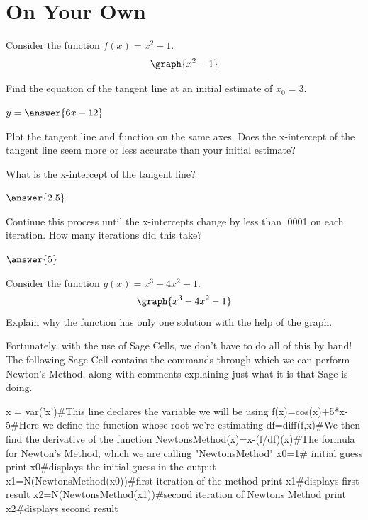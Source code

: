 \documentclass{ximera}
\begin{document}
\section{On Your Own}
\begin{question}
Consider the function $f(x) = x^2-1$.
\[
\graph{x^2-1}
\]

Find the equation of the tangent line at an initial estimate of $x_0=3$.

$y = \answer{6x-12}$

Plot the tangent line and function on the same axes. Does the x-intercept of the tangent line seem more or less accurate than your initial estimate?

\begin{multipleChoice}
\end{multipleChoice}

What is the x-intercept of the tangent line?

$\answer{2.5}$
\begin{onlineOnly}
\begin{sageCell}

\end{sageCell}
\end{onlineOnly}
Continue this process until the x-intercepts change by less than .0001 on each iteration. How many iterations did this take?

$\answer{5}$
\end{question}
\begin{question}
Consider the function $g(x) = x^3-4x^2-1$.
\[
\graph{x^3-4x^2-1}
\]
Explain why the function has only one solution with the help of the graph.

\begin{freeResponse}
\end{freeResponse}
\end{question}

Fortunately, with the use of Sage Cells, we don't have to do all of this by hand! The following Sage Cell contains the commands through which we can perform Newton's Method, along with comments explaining just what it is that Sage is doing.

\begin{onlineOnly}
\begin{sageCell}
x = var('x')#This line declares the variable we will be using
f(x)=cos(x)+5*x-5#Here we define the function whose root we're estimating
df=diff(f,x)#We then find the derivative of the function
NewtonsMethod(x)=x-(f/df)(x)#The formula for Newton's Method, which we are calling "NewtonsMethod"
x0=1# initial guess
print x0#displays the initial guess in the output
x1=N(NewtonsMethod(x0))#first iteration of the method
print x1#displays first result
x2=N(NewtonsMethod(x1))#second iteration of Newtons Method
print x2#displays second result
\end{sageCell}
\end{onlineOnly}
\end{document}
